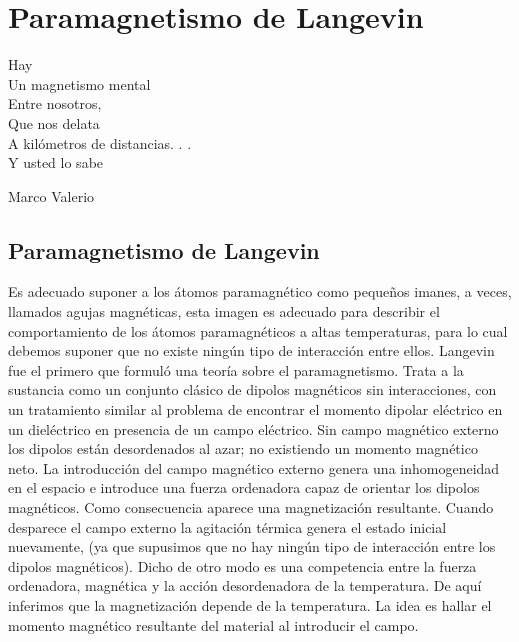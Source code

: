
\chapter{Paramagnetismo de Langevin} %

\begin{center}

Hay \\
Un magnetismo mental \\
Entre nosotros, \\
Que nos delata \\
A kilómetros de distancias. . . \\
Y usted lo sabe

\hspace{3.6cm} Marco Valerio\\

\end{center}


\section{Paramagnetismo de Langevin}

Es adecuado suponer a los átomos paramagnético como pequeños imanes, a veces, llamados agujas magnéticas, esta imagen es adecuado para describir el comportamiento de los átomos paramagnéticos a altas temperaturas, para lo cual debemos suponer que no existe ningún tipo de interacción entre ellos. Langevin fue el primero que formuló una teoría sobre el paramagnetismo. Trata a la sustancia como un conjunto clásico de dipolos magnéticos sin interacciones, con un tratamiento similar al problema de encontrar el momento dipolar eléctrico en un dieléctrico en presencia de un campo eléctrico. Sin campo magnético externo los dipolos están desordenados al azar; no existiendo un momento magnético neto. La introducción del campo magnético externo genera una inhomogeneidad en el espacio e introduce una fuerza ordenadora capaz de orientar los dipolos magnéticos. Como consecuencia aparece una magnetización resultante. Cuando desparece el campo externo la agitación térmica genera el estado inicial nuevamente, (ya que supusimos que no hay ningún tipo de interacción entre los dipolos magnéticos). Dicho de otro modo es una competencia entre la fuerza ordenadora, magnética y la acción desordenadora de la temperatura. De aquí inferimos que la magnetización depende de la temperatura. La idea es hallar el momento magnético resultante del material al introducir el campo.


